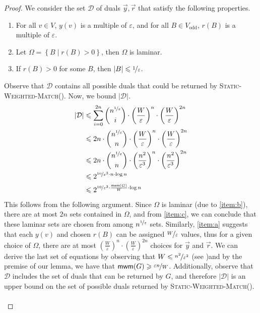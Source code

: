 \documentclass[a4paper,11pt]{article}
\newcommand{\card}[1]{|#1|}
\newcommand{\paren}[1]{\left ( #1 \right )}
\newcommand{\set}[1]{\ensuremath{\left\{ #1 \right\}}}
\newcommand{\eps}{\varepsilon}
\theoremstyle{definition}
\theoremstyle{definition}
\theoremstyle{definition}
\theoremstyle{definition}
\theoremstyle{definition}
\theoremstyle{definition}
\theoremstyle{definition}
\theoremstyle{definition}
\theoremstyle{definition}
\theoremstyle{definition}
\theoremstyle{definition}
\theoremstyle{definition}
\theoremstyle{definition}
\theoremstyle{definition}
\theoremstyle{definition}
\begin{document}
\begin{proof}
We consider the set $\mathcal{D}$ of duals $\vec{y},\vec{r}$ that satisfy the following properties.
\begin{enumerate}
\item For all $v\in V$, $y(v)$ is a multiple of $\eps$, and for all $B\in V_{\text{odd}}$, $r(B)$ is a multiple of $\eps$. \label{item:a}
\item Let $\Omega=\set{B\mid r(B)>0}$, then $\Omega$ is laminar. \label{item:b}
\item If $r(B)>0$ for some $B$, then $\card{B}\leqslant \nicefrac{1}{\eps}$. \label{item:c}
\end{enumerate}
Observe that $\mathcal{D}$ contains all possible duals that could be returned by \textsc{Static-Weighted-Match}(). Now, we bound $\card{\mathcal{D}}$.
\begin{align*}
\card{\mathcal{D}}&\leqslant \sum_{i=0}^{2n} {n^{\nicefrac{1}{\eps}} \choose i}\cdot \paren{\frac{W}{\eps}}^{n}\cdot \paren{\frac{W}{\eps}}^{2n}\\
				&\leqslant 2n\cdot {n^{\nicefrac{1}{\eps}} \choose n}\cdot \paren{\frac{W}{\eps}}^{n}\cdot \paren{\frac{W}{\eps}}^{2n}\\
				&\leqslant 2n\cdot {n^{\nicefrac{1}{\eps}} \choose n}\cdot \paren{\frac{n^2}{\eps^3}}^{n}\cdot \paren{\frac{n^2}{\eps^3}}^{2n}\\
				&\leqslant 2^{\nicefrac{10}{\eps^3}\cdot n\cdot \log n}\\
				&\leqslant 2^{\nicefrac{10}{\eps^3}\cdot \frac{\textsf{mwm}(G)}{W}\cdot \log n}
\end{align*}
This follows from the following argument. Since $\Omega$ is laminar (due to \ref{item:b}), there are at most $2n$ sets contained in $\Omega$, and from \ref{item:c}, we can conclude that these laminar sets are chosen from among $n^{\nicefrac{1}{\eps}}$ sets. Similarly, \ref{item:a} suggests that each $y(v)$ and chosen $r(B)$ can be assigned $\nicefrac{W}{\eps}$ values, thus for a given choice of $\Omega$, there are at most $\paren{\frac{W}{\eps}}^{n}\cdot \paren{\frac{W}{\eps}}^{2n}$ choices for $\vec{y}$ and $\vec{r}$. We can derive the last set of equations by observing that $W\leqslant \nicefrac{n^2}{\eps^2}$ (see )and by the premise of our lemma, we have that $\textsf{mwm}(G)\geqslant \nicefrac{\eps n}{W}$. Additionally, observe that $\mathcal{D}$ includes the set of duals that can be returned by $G$, and therefore $\card{\mathcal{D}}$ is an upper bound on the set of possible duals returned by \textsc{Static-Weighted-Match}(). \\ \\ 

\end{proof}
\end{document}
